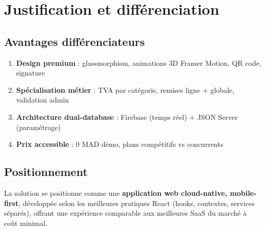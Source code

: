 \section{Justification et différenciation}

\subsection{Avantages différenciateurs}

\begin{enumerate}
    \item \textbf{Design premium} : glassmorphism, animations 3D Framer Motion, QR code, signature
    \item \textbf{Spécialisation métier} : TVA par catégorie, remises ligne + globale, validation admin
    \item \textbf{Architecture dual-database} : Firebase (temps réel) + JSON Server (paramétrage)
    \item \textbf{Prix accessible} : 0 MAD démo, plans compétitifs vs concurrents
\end{enumerate}

\subsection{Positionnement}

La solution se positionne comme une \textbf{application web cloud-native, mobile-first}, développée selon les meilleures pratiques React (hooks, contextes, services séparés), offrant une expérience comparable aux meilleures SaaS du marché à coût minimal.
